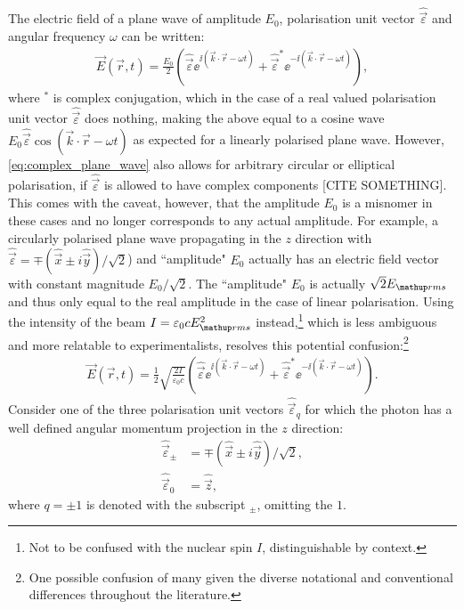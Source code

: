 The electric field of a plane wave of amplitude $E_0$, polarisation unit vector $\hat{\vec\varepsilon}$ and angular frequency $\omega$ can be written:
\begin{align}\label{eq:complex_plane_wave}
\vec E(\vec r, t) = \frac{E_0}2
\left(\hat{\vec\varepsilon} \ee^{\ii(\vec k \cdot \vec r - \omega t)}
+ \hat{\vec\varepsilon}^* \ee^{-\ii(\vec k \cdot \vec r - \omega t)} \right),
\end{align}
where $^*$ is complex conjugation, which in the case of a real valued polarisation unit vector $\hat{\vec\varepsilon}$ does nothing, making the above equal to a cosine wave $E_0\hat{\vec\varepsilon}\cos(\vec k \cdot \vec r - \omega t)$ as expected for a linearly polarised plane wave. However, \eqref{eq:complex_plane_wave} also allows for arbitrary circular or elliptical polarisation, if $\hat{\vec\varepsilon}$ is allowed to have complex components [CITE SOMETHING]. This comes with the caveat, however, that the amplitude $E_0$ is a misnomer in these cases and no longer corresponds to any actual amplitude. For example, a circularly polarised plane wave propagating in the $z$ direction with $\hat{\vec\varepsilon}=\mp(\hat{\vec{x}} \pm i \hat{\vec y})/\sqrt{2}$) and ``amplitude" $E_0$ actually has an electric field vector with constant magnitude $E_0/\sqrt{2}$. The ``amplitude" $E_0$ is actually $\sqrt{2}E_\up{rms}$ and thus only equal to the real amplitude in the case of linear polarisation. Using the intensity of the beam $I=\varepsilon_0 c E_\up{rms}^2$ instead,\footnote{Not to be confused with the nuclear spin $I$, distinguishable by context.} which is less ambiguous and more relatable to experimentalists, resolves this potential confusion:\footnote{One possible confusion of many given the diverse notational and conventional differences throughout the literature.}
\begin{align}\label{eq:complex_plane_wave_intensity}
\vec E(\vec r, t) = \frac12\sqrt{\frac{2I}{\varepsilon_0 c}}
\left(\hat{\vec\varepsilon} \ee^{\ii(\vec k \cdot \vec r - \omega t)}
+ \hat{\vec\varepsilon}^* \ee^{-\ii(\vec k \cdot \vec r - \omega t)} \right).
\end{align}
Consider one of the three polarisation unit vectors $\hat{\vec\varepsilon}_q$ for which the photon has a well defined angular momentum projection in the $z$ direction:
\begin{align}
\hat{\vec\varepsilon}_{\pm} &= \mp(\hat{\vec{x}} \pm i \hat{\vec y})/\sqrt{2},\\
\hat{\vec\varepsilon}_{0} &= \hat{\vec z},
\end{align}
where $q=\pm1$ is denoted with the subscript $_\pm$, omitting the $1$. 

